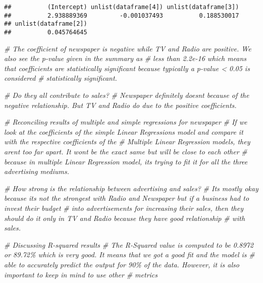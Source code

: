 \documentclass[
]{article}
\newenvironment{Shaded}{\begin{snugshade}}{\end{snugshade}}
\newcommand{\CommentTok}[1]{\textcolor[rgb]{0.56,0.35,0.01}{\textit{#1}}}
\newcommand{\NormalTok}[1]{#1}
\newcommand{\SpecialCharTok}[1]{\textcolor[rgb]{0.81,0.36,0.00}{\textbf{#1}}}
\begin{document}
\begin{Shaded}
\end{Shaded}

\begin{verbatim}
##          (Intercept) unlist(dataframe[4]) unlist(dataframe[3]) 
##          2.938889369         -0.001037493          0.188530017 
## unlist(dataframe[2]) 
##          0.045764645
\end{verbatim}

\begin{Shaded}
\begin{Highlighting}[]
\CommentTok{\# The coefficient of newspaper is negative while TV and Radio are positive. We also see the p{-}value given in the summary as}
\CommentTok{\# less than 2.2e{-}16 which means that coefficients are statistically significant because typically a p{-}value \textless{} 0.05 is considered}
\CommentTok{\# statistically significant. }

\CommentTok{\# Do they all contribute to sales?}
\CommentTok{\# Newspaper definitely doesn\textquotesingle{}t because of the negative relationship. But TV and Radio do due to the positive coefficients.}

\CommentTok{\# Reconciling results of multiple and simple regressions for newspaper}
\CommentTok{\# If we look at the coefficients of the simple Linear Regression\textquotesingle{}s model and compare it with the respective coefficients of the }
\CommentTok{\# Multiple Linear Regression models, they aren\textquotesingle{}t too far apart. It won\textquotesingle{}t be the exact same but will be close to each other }
\CommentTok{\# because in multiple Linear Regression model, it\textquotesingle{}s trying to fit it for all the three advertising mediums. }

\CommentTok{\# How strong is the relationship between advertising and sales?}
\CommentTok{\# It\textquotesingle{}s mostly okay because it\textquotesingle{}s not the strongest with Radio and Newspaper but if a business had to invest their budget }
\CommentTok{\# into advertisements for increasing their sales, then they should do it only in TV and Radio because they have good relationship}
\CommentTok{\# with sales. }

\CommentTok{\# Discussing R{-}squared results}
\CommentTok{\# The R{-}Squared value is computed to be 0.8972 or 89.72\% which is very good. It means that we got a good fit and the model is }
\CommentTok{\# able to accurately predict the output for 90\% of the data. However, it is also important to keep in mind to use other }
\CommentTok{\# metrics }


\end{Highlighting}
\end{Shaded}
\end{document}
